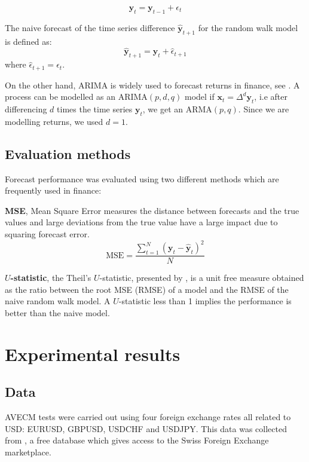 \begin{equation}
\mathbf{y}_t = \mathbf{y}_{t-1} + \epsilon_{t}
\label{rwmodel}
\end{equation}

The naive forecast of the time series difference $\hat{\mathbf{y}}_{t+1}$ for
the random walk model is defined as:
\begin{equation}
\hat{\mathbf{y}}_{t+1} = \mathbf{y}_t + \hat{\epsilon}_{t+1} 
\end{equation}
\noindent where  $\hat{\epsilon}_{t+1} = \epsilon_{t}$.

On the other hand, ARIMA is widely used to forecast returns in finance, see
\cite{tsay2005}. A process can be modelled as an ARIMA$(p,d,q)$ model if
$\mathbf{x}_t=\Delta^d \mathbf{y}_t $, i.e after differencing $d$ times the time
series $\mathbf{y}_t$,  we get an ARMA$(p,q)$. Since we are modelling returns,
we used $d=1$.


\subsection{Evaluation methods} \label{sec:evaluation}

Forecast performance was evaluated using two different methods which are
frequently used in finance:
\begin{description}
\item
{\bf MSE},  Mean Square Error measures the distance between forecasts
and the true values and large deviations from the true value have a
large impact due to squaring forecast error.
\begin{equation}\label{eq:MSE}
\text{MSE} = 
\frac{\displaystyle \sum_{t=1}^{N} (\mathbf{y}_t-\hat{\mathbf{y}}_t)^2}{N}
\end{equation}
\item {\bf $U$-statistic}, the Theil's $U$-statistic, presented by
\cite{theil1966}, is a unit free measure obtained as the ratio between the root
MSE (RMSE) of a model and the RMSE of the naive random walk model. A
$U$-statistic less than 1 implies the performance is better than the naive
model.
\end{description}


\section{Experimental results}
\label{sec:results}
\subsection{Data} \label{sec:unitroot}
AVECM tests were carried out using four foreign exchange rates all related to
USD: EURUSD, GBPUSD, USDCHF and USDJPY. This data was collected from
\cite{Dukascopy2014}, a free database which gives access to the Swiss Foreign
Exchange marketplace.

